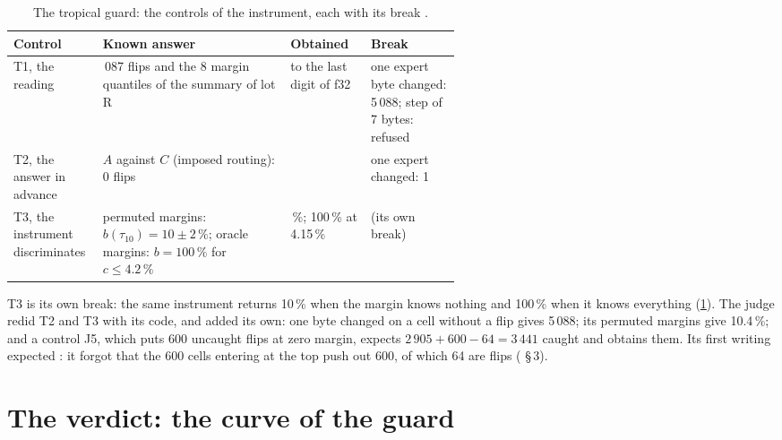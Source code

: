 \begin{table}[tbp]
\centering\small
\caption[The tropical guard: the controls]{The tropical guard: the controls of the instrument, each with its break \mes.}
\label{t3tro:tab:temoins}
\renewcommand{\arraystretch}{1.1}
\begin{tabularx}{\linewidth}{@{}>{\raggedright\arraybackslash}p{0.2\linewidth}>{\raggedright\arraybackslash}X>{\raggedright\arraybackslash}p{0.18\linewidth}>{\raggedright\arraybackslash}p{0.2\linewidth}@{}}
\toprule
Control & Known answer & Obtained & Break \\
\midrule
T1, the reading & 5\,087 flips and the 8 margin quantiles of the summary of lot R & to the last digit of f32 & one expert byte changed: 5\,088; step of 7 bytes: refused \\
T2, the answer in advance & $A$ against $C$ (imposed routing): 0 flips & 0 & one expert changed: 1 \\
T3, the instrument discriminates & permuted margins: $b(\tau_{10}) = 10 \pm 2\,\%$; oracle margins: $b = 100\,\%$ for $c \le 4.2\,\%$ & 10.05\,\%; 100\,\% at 4.15\,\% & (its own break) \\
\bottomrule
\end{tabularx}
\end{table}

T3 is its own break: the same instrument returns 10\,\% when the margin knows nothing and 100\,\% when it knows everything (\cref{t3tro:tab:temoins}). The judge redid T2 and T3 with its code, and added its own: one byte changed on a cell without a flip gives 5\,088; its permuted margins give 10.4\,\%; and a control J5, which puts 600 uncaught flips at zero margin, expects $2\,905 + 600 - 64 = 3\,441$ caught and obtains them. Its first writing expected : it forgot that the 600 cells entering at the top push out 600, of which 64 are flips ( §\,3).

\section{The verdict: the curve of the guard}\label{t3tro:sec:verdict}

